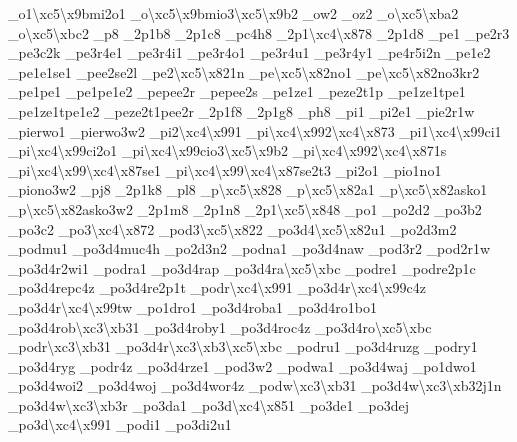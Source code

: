 {\-\_\-o1\textbackslash{}xc5\textbackslash{}x9bmi2o1 \-\_\-o\textbackslash{}xc5\textbackslash{}x9bmio3\textbackslash{}xc5\textbackslash{}x9b2 \-\_\-ow2 \-\_\-oz2 \-\_\-o\textbackslash{}xc5\textbackslash{}xba2 \-\_\-o\textbackslash{}xc5\textbackslash{}xbc2 \-\_\-p8 \-\_\-2p1b8 \-\_\-2p1c8 \-\_\-pc4h8 \-\_\-2p1\textbackslash{}xc4\textbackslash{}x878 \-\_\-2p1d8 \-\_\-pe1 \-\_\-pe2r3 \-\_\-pe3c2k \-\_\-pe3r4e1 \-\_\-pe3r4i1 \-\_\-pe3r4o1 \-\_\-pe3r4u1 \-\_\-pe3r4y1 \-\_\-pe4r5i2n \-\_\-pe1e2 \-\_\-pe1e1se1 \-\_\-pee2se2l \-\_\-pe2\textbackslash{}xc5\textbackslash{}x821n \-\_\-pe\textbackslash{}xc5\textbackslash{}x82no1 \-\_\-pe\textbackslash{}xc5\textbackslash{}x82no3kr2 \-\_\-pe1pe1 \-\_\-pe1pe1e2 \-\_\-pepee2r \-\_\-pepee2s \-\_\-pe1ze1 \-\_\-peze2t1p \-\_\-pe1ze1tpe1 \-\_\-pe1ze1tpe1e2 \-\_\-peze2t1pee2r \-\_\-2p1f8 \-\_\-2p1g8 \-\_\-ph8 \-\_\-pi1 \-\_\-pi2e1 \-\_\-pie2r1w \-\_\-pierwo1 \-\_\-pierwo3w2 \-\_\-pi2\textbackslash{}xc4\textbackslash{}x991 \-\_\-pi\textbackslash{}xc4\textbackslash{}x992\textbackslash{}xc4\textbackslash{}x873 \-\_\-pi1\textbackslash{}xc4\textbackslash{}x99ci1 \-\_\-pi\textbackslash{}xc4\textbackslash{}x99ci2o1 \-\_\-pi\textbackslash{}xc4\textbackslash{}x99cio3\textbackslash{}xc5\textbackslash{}x9b2 \-\_\-pi\textbackslash{}xc4\textbackslash{}x992\textbackslash{}xc4\textbackslash{}x871s \-\_\-pi\textbackslash{}xc4\textbackslash{}x99\textbackslash{}xc4\textbackslash{}x87se1 \-\_\-pi\textbackslash{}xc4\textbackslash{}x99\textbackslash{}xc4\textbackslash{}x87se2t3 \-\_\-pi2o1 \-\_\-pio1no1 \-\_\-piono3w2 \-\_\-pj8 \-\_\-2p1k8 \-\_\-pl8 \-\_\-p\textbackslash{}xc5\textbackslash{}x828 \-\_\-p\textbackslash{}xc5\textbackslash{}x82a1 \-\_\-p\textbackslash{}xc5\textbackslash{}x82asko1 \-\_\-p\textbackslash{}xc5\textbackslash{}x82asko3w2 \-\_\-2p1m8 \-\_\-2p1n8 \-\_\-2p1\textbackslash{}xc5\textbackslash{}x848 \-\_\-po1 \-\_\-po2d2 \-\_\-po3b2 \-\_\-po3c2 \-\_\-po3\textbackslash{}xc4\textbackslash{}x872 \-\_\-pod3\textbackslash{}xc5\textbackslash{}x822 \-\_\-po3d4\textbackslash{}xc5\textbackslash{}x82u1 \-\_\-po2d3m2 \-\_\-podmu1 \-\_\-po3d4muc4h \-\_\-po2d3n2 \-\_\-podna1 \-\_\-po3d4naw \-\_\-pod3r2 \-\_\-pod2r1w \-\_\-po3d4r2wi1 \-\_\-podra1 \-\_\-po3d4rap \-\_\-po3d4ra\textbackslash{}xc5\textbackslash{}xbc \-\_\-podre1 \-\_\-podre2p1c \-\_\-po3d4repc4z \-\_\-po3d4re2p1t \-\_\-podr\textbackslash{}xc4\textbackslash{}x991 \-\_\-po3d4r\textbackslash{}xc4\textbackslash{}x99c4z \-\_\-po3d4r\textbackslash{}xc4\textbackslash{}x99tw \-\_\-po1dro1 \-\_\-po3d4roba1 \-\_\-po3d4ro1bo1 \-\_\-po3d4rob\textbackslash{}xc3\textbackslash{}xb31 \-\_\-po3d4roby1 \-\_\-po3d4roc4z \-\_\-po3d4ro\textbackslash{}xc5\textbackslash{}xbc \-\_\-podr\textbackslash{}xc3\textbackslash{}xb31 \-\_\-po3d4r\textbackslash{}xc3\textbackslash{}xb3\textbackslash{}xc5\textbackslash{}xbc \-\_\-podru1 \-\_\-po3d4ruzg \-\_\-podry1 \-\_\-po3d4ryg \-\_\-podr4z \-\_\-po3d4rze1 \-\_\-pod3w2 \-\_\-podwa1 \-\_\-po3d4waj \-\_\-po1dwo1 \-\_\-po3d4woi2 \-\_\-po3d4woj \-\_\-po3d4wor4z \-\_\-podw\textbackslash{}xc3\textbackslash{}xb31 \-\_\-po3d4w\textbackslash{}xc3\textbackslash{}xb32j1n \-\_\-po3d4w\textbackslash{}xc3\textbackslash{}xb3r \-\_\-po3da1 \-\_\-po3d\textbackslash{}xc4\textbackslash{}x851 \-\_\-po3de1 \-\_\-po3dej \-\_\-po3d\textbackslash{}xc4\textbackslash{}x991 \-\_\-podi1 \-\_\-po3di2u1 }
